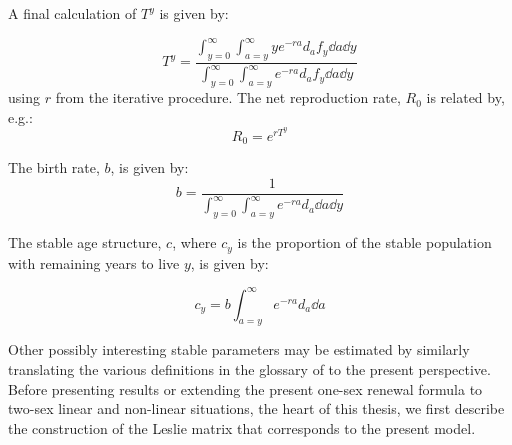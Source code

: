  \FloatBarrier
A final calculation of $T^y$ is given by:

\begin{equation}
\label{eq:Ty}
 T^y =  \frac{\int _{y=0}^\infty \int _{a=y}^\infty y e^{-ra} d_a f_y \dd a
\dd y}{\int _{y=0}^\infty \int _{a=y}^\infty e^{-ra} d_a f_y \dd a \dd y}
\end{equation}
using $r$ from the iterative procedure. The net reproduction rate, $R_0$ is
related by, e.g.:
\begin{equation}
\label{eq:R0fromTy}
R_0 = e^{r T^y}
\end{equation}

The birth rate, $b$, is given by:
\begin{equation}
b = \frac{1}{\int _{y=0}^\infty \int _{a=y}^\infty e^{-ra} d_a \dd a
\dd y}
\end{equation}

The stable age structure, $c$, where $c_y$ is the
proportion of the stable population with remaining years to live $y$, is given
by:

\begin{equation}
c_y = b \int _{a=y}^\infty e^{-ra} d_a \dd a
\end{equation}

Other possibly interesting stable parameters may be estimated by
similarly translating the various definitions in the glossary of
\citet{coale1972growth} to the present perspective. Before presenting 
results or extending the present one-sex renewal
formula to two-sex linear and non-linear situations, the heart of this 
thesis, we first describe the construction of the Leslie matrix that corresponds to the
present model.